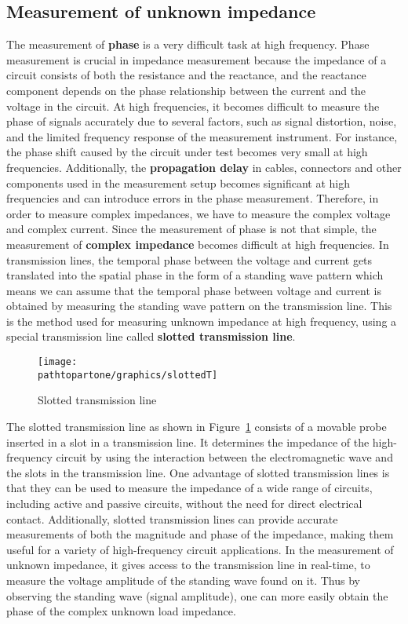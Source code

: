 \subsection{Measurement of unknown impedance }
The measurement of \textbf{phase} is a very difficult task at high frequency. Phase measurement is crucial in impedance measurement because the impedance of a circuit consists of both the resistance and the reactance, and the reactance component depends on the phase relationship between the current and the voltage in the circuit. At high frequencies, it becomes difficult to measure the phase of signals accurately due to several factors, such as signal distortion, noise, and the limited frequency response of the measurement instrument. For instance, the phase shift caused by the circuit under test becomes very small at high frequencies. Additionally, the \textbf{propagation delay} in cables, connectors and other components used in the measurement setup becomes significant at high frequencies and can introduce errors in the phase measurement. Therefore, in order to measure complex impedances, we have to measure the complex voltage and complex current. Since the measurement of phase is not that simple, the measurement of \textbf{complex impedance} becomes difficult at high frequencies. In transmission lines, the temporal phase between the voltage and current gets translated into the spatial phase in the form of a standing wave pattern which means we can assume that the temporal phase between voltage and current is obtained by measuring the standing wave pattern on the transmission line. This is the method used for measuring unknown impedance at high frequency, using a special transmission line called \textbf{slotted
transmission line}.
\begin{figure}[h]
\centering
\texttt{[image: \\pathtopartone/graphics/slottedT]}
\caption{Slotted transmission line}
\label{fig:slottedT}
\end{figure}

The slotted transmission line as shown in Figure~\ref{fig:slottedT} consists of a movable probe inserted in a slot in a transmission line. It determines the impedance of the high-frequency circuit by using the interaction between the electromagnetic wave and the slots in the transmission line. One advantage of slotted transmission lines is that they can be used to measure the impedance of a wide range of circuits, including active and passive circuits, without the need for direct electrical contact. Additionally, slotted transmission lines can provide accurate measurements of both the magnitude and phase of the impedance, making them useful for a variety of high-frequency circuit applications. In the measurement of unknown impedance, it gives access to the transmission line in real-time, to measure the voltage amplitude of the standing wave found on it. Thus by observing the standing wave (signal amplitude), one can more easily obtain the phase of the complex unknown load impedance.

